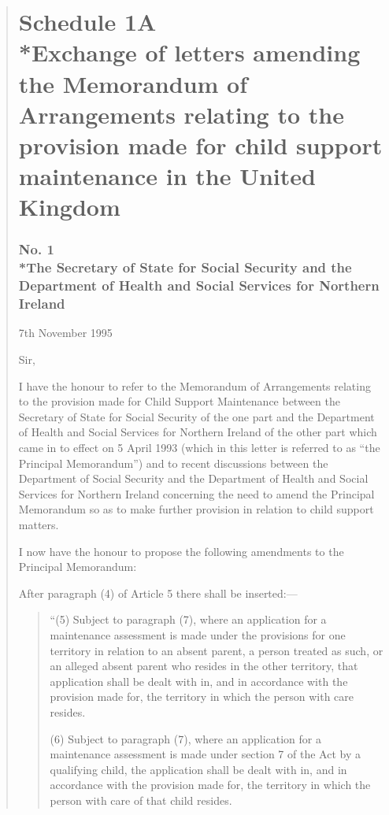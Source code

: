 \documentclass[12pt,a4paper]{article}
\begin{document}
\renewcommand\parthead{--- Schedule}

\begin{quotation}
\part*{Schedule 1A\\*Exchange of letters amending the Memorandum of Arrangements relating to the provision made for child support maintenance in the United Kingdom}

\section*{\sloppy No. 1\\*The Secretary of State for Social Security and the Department of Health and Social Services for Northern Ireland}

7th November 1995

  Sir,

  I have the honour to refer to the Memorandum of Arrangements relating to the provision made for Child Support Maintenance between the Secretary of State for Social Security of the one part and the Department of Health and Social Services for Northern Ireland of the other part which came in to effect on 5 April 1993 (which in this letter is referred to as “the Principal Memorandum”) and to recent discussions between the Department of Social Security and the Department of Health and Social Services for Northern Ireland concerning the need to amend the Principal Memorandum so as to make further provision in relation to child support matters.

  I now have the honour to propose the following amendments to the Principal Memorandum:

  After paragraph (4) of Article 5 there shall be inserted:—
\begin{quotation}
 “(5) Subject to paragraph (7), where an application for a maintenance assessment is made under the provisions for one territory in relation to an absent parent, a person treated as such, or an alleged absent parent who resides in the other territory, that application shall be dealt with in, and in accordance with the provision made for, the territory in which the person with care resides.

(6) Subject to paragraph (7), where an application for a maintenance assessment is made under section 7 of the Act by a qualifying child, the application shall be dealt with in, and in accordance with the provision made for, the territory in which the person with care of that child resides.


\end{quotation}
\end{quotation}
\end{document}
